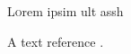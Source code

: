 \lettrine[nindent=0em,lines=3]{L}orem ipsim ult assh
\blindtext %

\blindtext %

A text reference \cite{L}.

\blindtext %

